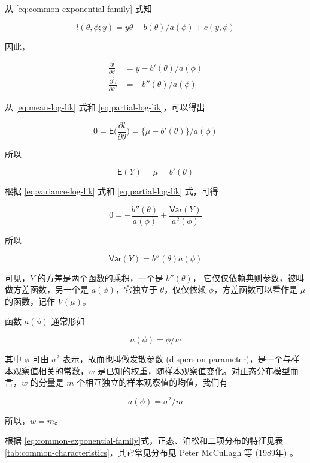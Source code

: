 \documentclass[12pt,a4paper,UTF8,twoside]{book}
\theoremstyle{definition}
\theoremstyle{definition}
\theoremstyle{definition}
\theoremstyle{remark}
\begin{document}
从 \eqref{eq:common-exponential-family} 式知

\[ l(\theta,\phi;y) = {y\theta - b(\theta)}/a(\phi) + c(y,\phi) \]

因此，

\begin{equation}
\begin{aligned}
\frac{\partial l}{\partial \theta} & = {y - b'(\theta)}/a(\phi)  \\
\frac{\partial^2 l}{\partial \theta^2}  & = - b''(\theta)/a(\phi)
\end{aligned} \label{eq:partial-log-lik}
\end{equation}

从 \eqref{eq:mean-log-lik} 式和 \eqref{eq:partial-log-lik}，可以得出

\[ 
0 = \mathsf{E}\big( \frac{\partial l}{\partial \theta} \big) = \big\{ \mu - b'(\theta) \big\}/a(\phi)
\]

所以

\[ \mathsf{E}(Y) = \mu = b'(\theta) \]

根据 \eqref{eq:variance-log-lik} 式和 \eqref{eq:partial-log-lik} 式，可得

\[ 0 = - \frac{b''(\theta)}{a(\phi)} + \frac{\mathsf{Var}(Y)}{a^2(\phi)} \]

所以

\[ \mathsf{Var}(Y) = b''(\theta)a(\phi) \]

可见，\(Y\) 的方差是两个函数的乘积，一个是 \(b''(\theta)\)，
它仅仅依赖典则参数，被叫做方差函数，另一个是 \(a(\phi)\)，它独立于
\(\theta\)，仅仅依赖 \(\phi\)，方差函数可以看作是 \(\mu\) 的函数，记作
\(V(\mu)\)。

函数 \(a(\phi)\) 通常形如

\[ a(\phi) = \phi/w \]

其中 \(\phi\) 可由 \(\sigma^2\) 表示，故而也叫做发散参数 (dispersion
parameter)，是一个与样本观察值相关的常数，\(w\)
是已知的权重，随样本观察值变化。对正态分布模型而言，\(w\) 的分量是 \(m\)
个相互独立的样本观察值的均值，我们有

\[ a(\phi) = \sigma^2/m\]

所以，\(w = m\)。

根据
\eqref{eq:common-exponential-family}式，正态、泊松和二项分布的特征见表
\ref{tab:common-characteristics}，其它常见分布见 Peter McCullagh 等
(1989年) \citep{McCullagh1989}。
\end{document}
